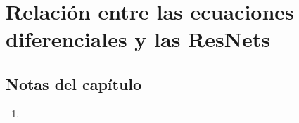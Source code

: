 
\chapter{Relación entre las ecuaciones diferenciales y las ResNets}

 \section{Notas del capítulo}
 \begin{enumerate}
    \item -
 \end{enumerate}
